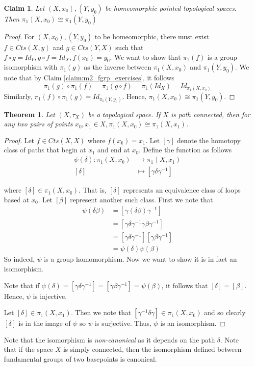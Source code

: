 \documentclass{article}
\newtheorem{theorem}{Theorem}[section]
\newtheorem{claim}{Claim}[section]
\theoremstyle{definition}
\newcommand{\topspace}[1]{$(#1, \tau_{#1})$}
\newcommand{\isom}{\cong} %
\begin{document}
\begin{claim}
Let $(X,x_0), (Y,y_0)$ be homeomorphic pointed topological spaces. Then $\pi_{1}(X,x_0) \isom \pi_{1}(Y,y_0)$
\end{claim}
\begin{proof}
For $(X,x_0), (Y,y_0)$ to be homeomorphic, there must exist $f \in Cts(X,y)$ and $g \in Cts(Y,X)$ such that $f \circ g = Id_Y, g \circ f = Id_X, f(x_0)=y_0$. We want to show that $\pi_{1}(f)$ is a group isomorphism with $\pi_{1}(g)$ as the inverse between $\pi_{1}(X,x_0)$ and $\pi_{1}(Y,y_0)$. We note that by Claim \ref{claim:m2_fgrp_exercises}, it follows
\begin{equation*}
    \pi_{1}(g) \circ \pi_{1}(f) = \pi_{1}(g \circ f) = \pi_{1}(Id_X) = Id_{\pi_{1}(X,x_0)}
\end{equation*}
Similarly, $\pi_{1}(f) \circ \pi_{1}(g) = Id_{\pi_{1}(Y,y_0)}$. Hence, $\pi_{1}(X,x_0) \isom \pi_{1}(Y,y_0)$.
\end{proof}

\begin{theorem}
Let \topspace{X} be a topological space. If $X$ is path connected, then for any two pairs of points $x_0,x_1 \in X, \pi_{1}(X,x_0) \isom \pi_{1}(X,x_1)$.
\end{theorem}
\begin{proof}
Let $f \in Cts(X,X)$ where $f(x_0) = x_1$. Let $[\gamma]$ denote the homotopy class of paths that begin at $x_1$ and end at $x_0$. Define the function as follows
\begin{align*}
    \psi(\delta): \pi_{1}(X,x_0) &\to \pi_{1}(X,x_1)\\
    [\delta] &\mapsto [\gamma \delta \gamma^{-1}]
\end{align*}

where $[\delta] \in \pi_{1}(X,x_0)$. That is, $[\delta]$ represents an equivalence class of loops based at $x_0$. Let $[\beta]$ represent another such class. First we note that 
\begin{align*}
\psi(\delta\beta) &= [\gamma(\delta\beta)\gamma^{-1}]\\
                    &= [\gamma\delta\gamma^{-1}\gamma\beta\gamma^{-1}]\\
                    &= [\gamma\delta\gamma^{-1}][\gamma\beta\gamma^{-1}]\\
                    &= \psi(\delta)\psi(\beta)
\end{align*}
So indeed, $\psi$ is a group homomorphism. Now we want to show it is in fact an isomorphism.

Note that if $\psi(\delta) = [\gamma \delta \gamma^{-1}] = [\gamma \beta \gamma^{-1}] = \psi(\beta)$, it follows that $[\delta]=[\beta]$. Hence, $\psi$ is injective.

Let $[\delta] \in \pi_{1}(X,x_1)$. Then we note that $[\gamma^{-1} \delta \gamma] \in \pi_{1}(X,x_0)$ and so clearly $[\delta]$ is in the image of $\psi$ so $\psi$ is surjective. Thus, $\psi$ is an isomorphism.
\end{proof}
Note that the isomorphism is \emph{non-canonical} as it depends on the path $\delta$. Note that if the space $X$ is simply connected, then the isomorphism defined between fundamental groups of two basepoints is canonical.
\pagebreak
\end{document}
